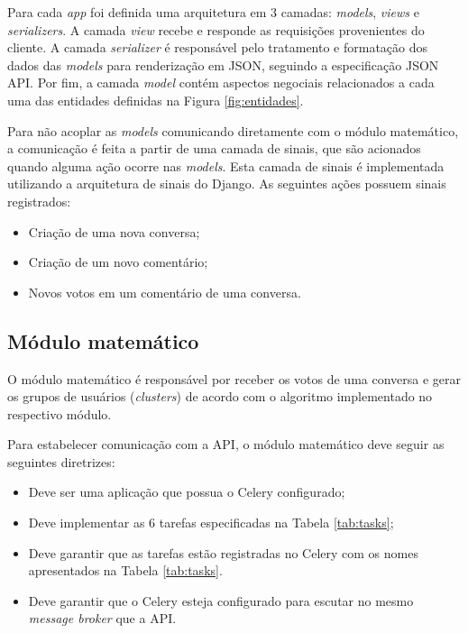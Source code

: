 	Para cada \textit{app} foi definida uma arquitetura
	em 3 camadas: \textit{models}, \textit{views} e \textit{serializers}.
	A camada \textit{view} recebe e responde as requisições provenientes do cliente.
	A camada \textit{serializer} é responsável pelo tratamento e formatação dos dados das \textit{models}
	para renderização em JSON, seguindo a especificação JSON API.
	Por fim, a camada \textit{model} contém aspectos negociais relacionados a cada uma das entidades definidas na 
	Figura \ref{fig:entidades}.
	
	Para não acoplar as \textit{models} comunicando diretamente com o módulo matemático,
	a comunicação é feita a partir de uma camada de sinais, que são acionados quando alguma ação ocorre nas \textit{models}.
	Esta camada de sinais é implementada utilizando a arquitetura de sinais do Django.
	As seguintes ações possuem sinais registrados:
	
	\begin{itemize}
	 \item Criação de uma nova conversa;
	 \item Criação de um novo comentário;
	 \item Novos votos em um comentário de uma conversa.
	\end{itemize}

    
    
    \subsection{Módulo matemático}
	
	O módulo matemático é responsável por receber os votos de uma conversa
	e gerar os grupos de usuários (\textit{clusters}) de acordo com o algoritmo implementado no respectivo módulo.

	Para estabelecer comunicação com a API, o módulo matemático deve seguir as seguintes diretrizes:
	\begin{itemize}
	  \item Deve ser uma aplicação que possua o Celery configurado;
	  \item Deve implementar as 6 tarefas especificadas na Tabela \ref{tab:tasks};
	  \item Deve garantir que as tarefas estão registradas no Celery com os nomes apresentados na Tabela \ref{tab:tasks}.
	  \item Deve garantir que o Celery esteja configurado para escutar no mesmo \textit{message broker} que a API.
	\end{itemize}
	

